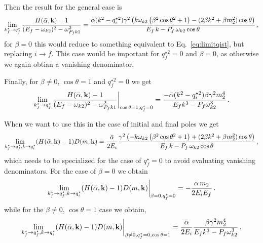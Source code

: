 \documentclass[aps,prd,onecolumn,groupedaddress]{revtex4-2}
\begin{document}
Then the result for the general case is
\begin{equation}
     \lim_{k^{\star}_f\to q^\star_f} \frac{ H(\bar{\alpha}, \textbf k) - 1}{(E_f-\omega_{k2})^2-\omega_{P_fk1}^2}
     = \frac{\bar \alpha(k^{2} - q^{\star 2}_i)\gamma ^2 \left(k \omega_{k2} \left(\beta ^2 \cos\theta^2+1\right)-(2 \beta  k^2 +\beta  m_2^2 )\cos\theta\right)}{E_f \,k-P_f \,\omega_{k2}\cos\theta }\,,
\end{equation}
for $\beta=0$ this would reduce to something equivalent to Eq.~\ref{eq:limitqist}, but replacing $i\to f$.
This case would be important for $q^{\star2}_f=0$ and $\beta=0$, as otherwise we again obtian a vanishing denominator.

Finally, for $\beta\neq0$, $\cos\theta=1$ and $q^{\star2}_f=0$ we get
\begin{equation}
    \lim_{k^{\star}_f\to q^\star_f} \frac{ H(\bar{\alpha}, \textbf k) - 1}{(E_f-\omega_{k2})^2-\omega_{P_fk1}^2}
    \bigg|_{\cos\theta=1,q^{\star}_f=0}
    =\frac{-\bar \alpha(k^{2} - q^{\star 2}_i)\beta  \gamma ^2 m_2^4}{E_f k^3-P_f\omega_{k2}^{3}}\,.
\end{equation}


When we want to use this in the case of initial and final poles we get
\begin{equation}
    \lim_{k^{\star}_f\to q^\star_f,k\to q^\star_i}  (H(\bar{\alpha}, \textbf k) - 1)D(m,\mathbf k)
    = \frac{\bar \alpha }{2E_i }\frac{\gamma ^2 \left(-k \omega_{k2} \left(\beta ^2 \cos\theta^2+1\right)+(2 \beta  k^2 +\beta  m_2^2 )\cos\theta\right)}{E_f \,k-P_f \,\omega_{k2}\cos\theta }\,,
\end{equation}
which needs to be specialized for the case of $q^\star_f=0$ to avoid evaluating vanishing denominators.
For the case of $\beta=0$ we obtain
\begin{equation}
     \lim_{k^{\star}_f\to q^\star_f,k\to q^\star_i}  (H(\bar{\alpha}, \textbf k) - 1)D(m,\mathbf k)
      \bigg|_{\beta=0,q^{\star}_f=0}
      = -\frac{\bar \alpha \,m_2}{2E_iE_f}\,.
\end{equation}
while for the $\beta\neq0$, $\cos\theta=1$ case we obtain,
\begin{equation}
     \lim_{k^{\star}_f\to q^\star_f,k\to q^\star_i}  (H(\bar{\alpha}, \textbf k) - 1)D(m,\mathbf k)
      \bigg|_{\beta\neq0,q^{\star}_f=0,\cos\theta=1}
      = \frac{\bar \alpha }{2E_i}\frac{\beta  \gamma ^2 m_2^4}{E_f k^3-P_f\omega_{k2}^{3}}\,.
\end{equation}
\end{document}

